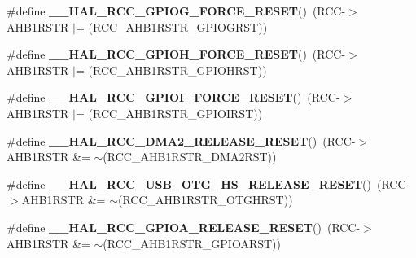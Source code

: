 \begin{DoxyCompactItemize}
\#define {\bfseries \+\_\+\+\_\+\+H\+A\+L\+\_\+\+R\+C\+C\+\_\+\+G\+P\+I\+O\+G\+\_\+\+F\+O\+R\+C\+E\+\_\+\+R\+E\+S\+ET}()~(R\+CC-\/$>$A\+H\+B1\+R\+S\+TR $\vert$= (R\+C\+C\+\_\+\+A\+H\+B1\+R\+S\+T\+R\+\_\+\+G\+P\+I\+O\+G\+R\+ST))
\item 
\mbox{\label{group___r_c_c_ex___force___release___peripheral___reset_ga4f05c575d762edf40a6d17f88671b68d}} 
\#define {\bfseries \+\_\+\+\_\+\+H\+A\+L\+\_\+\+R\+C\+C\+\_\+\+G\+P\+I\+O\+H\+\_\+\+F\+O\+R\+C\+E\+\_\+\+R\+E\+S\+ET}()~(R\+CC-\/$>$A\+H\+B1\+R\+S\+TR $\vert$= (R\+C\+C\+\_\+\+A\+H\+B1\+R\+S\+T\+R\+\_\+\+G\+P\+I\+O\+H\+R\+ST))
\item 
\mbox{\label{group___r_c_c_ex___force___release___peripheral___reset_ga9570ddd4e5237c67654ffa3ef32a1a3a}} 
\#define {\bfseries \+\_\+\+\_\+\+H\+A\+L\+\_\+\+R\+C\+C\+\_\+\+G\+P\+I\+O\+I\+\_\+\+F\+O\+R\+C\+E\+\_\+\+R\+E\+S\+ET}()~(R\+CC-\/$>$A\+H\+B1\+R\+S\+TR $\vert$= (R\+C\+C\+\_\+\+A\+H\+B1\+R\+S\+T\+R\+\_\+\+G\+P\+I\+O\+I\+R\+ST))
\item 
\mbox{\label{group___r_c_c_ex___force___release___peripheral___reset_gab7d22b3d82cd2616c8e3fa930e437757}} 
\#define {\bfseries \+\_\+\+\_\+\+H\+A\+L\+\_\+\+R\+C\+C\+\_\+\+D\+M\+A2\+\_\+\+R\+E\+L\+E\+A\+S\+E\+\_\+\+R\+E\+S\+ET}()~(R\+CC-\/$>$A\+H\+B1\+R\+S\+TR \&= $\sim$(R\+C\+C\+\_\+\+A\+H\+B1\+R\+S\+T\+R\+\_\+\+D\+M\+A2\+R\+ST))
\item 
\mbox{\label{group___r_c_c_ex___force___release___peripheral___reset_ga3a66bffab4f38d4ee9dfd9271209b32d}} 
\#define {\bfseries \+\_\+\+\_\+\+H\+A\+L\+\_\+\+R\+C\+C\+\_\+\+U\+S\+B\+\_\+\+O\+T\+G\+\_\+\+H\+S\+\_\+\+R\+E\+L\+E\+A\+S\+E\+\_\+\+R\+E\+S\+ET}()~(R\+CC-\/$>$A\+H\+B1\+R\+S\+TR \&= $\sim$(R\+C\+C\+\_\+\+A\+H\+B1\+R\+S\+T\+R\+\_\+\+O\+T\+G\+H\+R\+ST))
\item 
\mbox{\label{group___r_c_c_ex___force___release___peripheral___reset_gad56e47c2eacd972491f94296053d0cc3}} 
\#define {\bfseries \+\_\+\+\_\+\+H\+A\+L\+\_\+\+R\+C\+C\+\_\+\+G\+P\+I\+O\+A\+\_\+\+R\+E\+L\+E\+A\+S\+E\+\_\+\+R\+E\+S\+ET}()~(R\+CC-\/$>$A\+H\+B1\+R\+S\+TR \&= $\sim$(R\+C\+C\+\_\+\+A\+H\+B1\+R\+S\+T\+R\+\_\+\+G\+P\+I\+O\+A\+R\+ST))

\end{DoxyCompactItemize}
